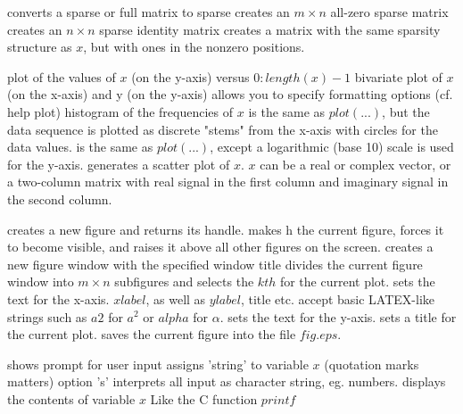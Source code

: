 	{converts a sparse or full matrix to sparse}
	{creates an $m \times n$ all-zero sparse matrix}
	{creates an $n \times n$ sparse identity matrix}
	{creates a matrix with the same sparsity structure as $x$, but with ones in the nonzero positions.}

	{plot of the values of $x$ (on the y-axis) versus $0:length(x)-1$}
	{bivariate plot of $x$ (on the x-axis) and y (on the y-axis)}
	{allows you to specify formatting options (cf. help plot)}
	{histogram of the frequencies of $x$}
	{is the same as $plot(...)$, but the data sequence is plotted as discrete "stems" from the x-axis with circles for the data values.}
	{is the same as $plot(...)$, except a logarithmic (base 10) scale is used for the y-axis.}
	{generates a scatter plot of $x$. $x$ can be a real or complex vector, or a two-column matrix with real signal in the first column and imaginary signal in the second column.}

	{creates a new figure and returns its handle.}
	{makes h the current figure, forces it to become visible, and raises it above all other figures on the screen.}
	{creates a new figure window with the specified window title}
	{divides the current figure window into $m \times n$ subfigures and selects the $kth$ for the current plot.}
	{sets the text for the x-axis. $xlabel$, as well as
$ylabel$, title etc. accept basic LATEX-like strings such as $a$\expon $2$ for
$a^2$ or \bs $alpha$ for $\alpha$.}
	{sets the text for the y-axis.}
	{sets a title for the current plot.}
	{saves the current figure into the file $fig.eps$.}

	{shows prompt for user input}
	{assigns 'string' to variable $x$ (quotation marks matters)}
	{option 's' interprets all input as character string, eg. numbers.}
	{displays the contents of variable $x$}
	{Like the C function $printf$}

